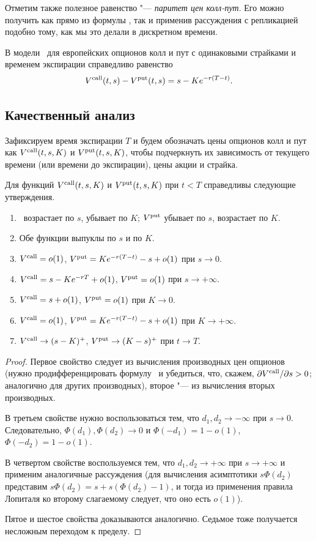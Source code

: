 Отметим также полезное равенство "--- \emph{паритет цен колл-пут}.
Его можно получить как прямо из формулы \bs, так и применив рассуждения с репликацией подобно тому, как мы это делали в дискретном времени.

\begin{corollary}
В модели \bs\ для европейских опционов колл и пут с одинаковыми страйками и временем экспирации справедливо равенство
\[
V^{\text{\normalfont call}}(t,s) - V^{\text{\normalfont put}}(t,s) = s - K e^{-r(T-t)}.
\]
\end{corollary}


\subsection{Качественный анализ}
Зафиксируем время экспирации $T$ и будем обозначать цены опционов колл и пут как $V^{\text{\normalfont call}}(t,s,K)$ и $V^{\text{\normalfont put}}(t,s,K)$, чтобы подчеркнуть их зависимость от текущего времени (или времени до экспирации), цены акции и страйка.
\begin{proposition}
Для функций $V^{\text{\normalfont call}}(t,s, K)$ и $V^{\text{\normalfont put}}(t,s, K)$ при $t<T$ справедливы следующие утверждения.
\begin{enumerate}
\item \VC\ возрастает по $s$, убывает по $K$; $V^{\text{\normalfont put}}$ убывает по $s$, возрастает по $K$.
\item Обе функции выпуклы по $s$ и по $K$.
\item $V^{\text{\normalfont call}} = o(1)$, $V^{\text{\normalfont put}}= Ke^{-r(T-t)} - s + o(1)$ при $s\to 0$.
\item $V^{\text{\normalfont call}} = s - Ke^{-rT} + o(1)$, $V^{\text{\normalfont put}} = o(1)$ при $s\to+\infty$.
\item $V^{\text{\normalfont call}} = s + o(1)$, $V^{\text{\normalfont put}} = o(1)$ при $K\to 0 $.
\item $V^{\text{\normalfont call}} = o(1)$, $V^{\text{\normalfont put}} = Ke^{-r(T-t)} - s + o(1)$ при $K\to+\infty$.
\item $V^{\text{\normalfont call}} \to (s-K)^+$, $V^{\text{\normalfont put}} \to (K-s)^+$ при $t\to T$.
\end{enumerate}
\end{proposition}

\begin{proof}
Первое свойство следует из вычисления производных цен опционов (нужно продифференцировать формулу \bs\ и убедиться, что, скажем, $\partial V^{\text{\normalfont call}}/\partial s>0$; аналогично для других производных), второе "--- из вычисления вторых производных.

В третьем свойстве нужно воспользоваться тем, что $d_1,d_2 \to -\infty$ при $s\to0$. 
Следовательно, $\Phi(d_1),\Phi(d_2) \to 0$ и $\Phi(-d_1) = 1 - o(1)$, $\Phi(-d_2) = 1 - o(1)$.

В четвертом свойстве воспользуемся тем, что $d_1,d_2 \to +\infty$ при $s\to+\infty$ и применим аналогичные рассуждения (для вычисления асимптотики $s\Phi(d_2)$ представим $s\Phi(d_2) = s + s(\Phi(d_2)-1)$, и тогда из применения правила Лопиталя ко второму слагаемому следует, что оно есть $o(1)$).

Пятое и шестое свойства доказываются аналогично. Седьмое тоже получается несложным переходом к пределу.
\end{proof}

